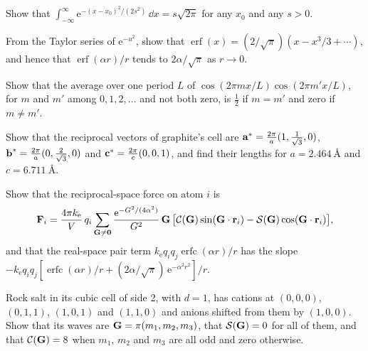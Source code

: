 \begin{exercise}
\label{ex:md-normal}
Show that $\int_{-\infty}^{\infty}\mathrm{e}^{-(x - x_0)^2/(2s^2)}\,\dd x
= s\sqrt{2\pi}$ for any $x_0$ and any $s > 0$.
\end{exercise}

\begin{exercise}
\label{ex:md-erf}
From the Taylor series of $\mathrm{e}^{-u^2}$, show that
$\operatorname{erf}(x) = (2/\sqrt\pi)(x - x^3/3 + \dotsb)$, and hence that
$\operatorname{erf}(\alpha r)/r$ tends to $2\alpha/\sqrt\pi$ as $r \to 0$.
\end{exercise}

\begin{exercise}
\label{ex:md-orthogonal}
Show that the average over one period $L$ of $\cos(2\pi mx/L)\cos(2\pi
m'x/L)$, for $m$ and $m'$ among $0, 1, 2, \dots$ and not both zero, is
$\frac12$ if $m = m'$ and zero if $m \neq m'$.
\end{exercise}

\begin{exercise}
\label{ex:md-reciprocal}
Show that the reciprocal vectors of graphite's cell are $\bm{\mathrm{a}}^* =
\frac{2\pi}{a}(1, \frac1{\sqrt3}, 0)$, $\bm{\mathrm{b}}^* = \frac{2\pi}{a}(0,
\frac2{\sqrt3}, 0)$ and $\bm{\mathrm{c}}^* = \frac{2\pi}{c}(0, 0, 1)$, and find
their lengths for $a = \SI{2.464}{\angstrom}$ and $c =
\SI{6.711}{\angstrom}$.
\end{exercise}

\begin{exercise}
\label{ex:md-forces}
Show that the reciprocal-space force on atom $i$ is
\begin{equation*}
   \bm{\mathrm{F}}_i = \frac{4\pi k_{\mathrm e}}{V}\,q_i\sum_{\bm{\mathrm{G}}\neq\bm{\mathrm{0}}}
   \frac{\mathrm{e}^{-G^2/(4\alpha^2)}}{G^2}\,\bm{\mathrm{G}}\,\bigl[\mathcal{C}(\bm{\mathrm{G}})
   \sin(\bm{\mathrm{G}}\cdot\bm{\mathrm{r}}_i) - \mathcal{S}(\bm{\mathrm{G}})\cos(\bm{\mathrm{G}}\cdot\bm{\mathrm{r}}_i)\bigr] ,
\end{equation*}
and that the real-space pair term $k_{\mathrm e}q_iq_j\operatorname{erfc}
(\alpha r)/r$ has the slope $-k_{\mathrm e}q_iq_j[\operatorname{erfc}(\alpha
r)/r + (2\alpha/\sqrt\pi)\,\mathrm{e}^{-\alpha^2r^2}]/r$.
\end{exercise}

\begin{exercise}
\label{ex:md-rocksalt}
Rock salt in its cubic cell of side 2, with $d = 1$, has cations at $(0,
0, 0)$, $(0, 1, 1)$, $(1, 0, 1)$ and $(1, 1, 0)$ and anions shifted from
them by $(1, 0, 0)$. Show that its waves are $\bm{\mathrm{G}} = \pi(m_1, m_2,
m_3)$, that $\mathcal{S}(\bm{\mathrm{G}}) = 0$ for all of them, and that $\mathcal{C}(\bm{\mathrm{G}}) = 8$
when $m_1$, $m_2$ and $m_3$ are all odd and zero otherwise.
\end{exercise}

